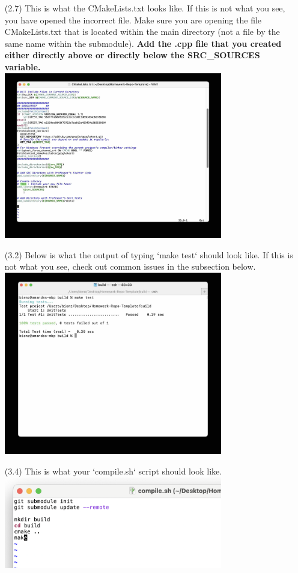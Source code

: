 \documentclass{article} %
\begin{document}
\begin{enumerate}
    \item [(2.7)] This is what the CMakeLists.txt looks like.  If this is not what you see, you have opened the incorrect file.  Make sure you are opening the file CMakeLists.txt that is located within the main directory (not a file by the same name within the submodule).  \textbf{Add the .cpp file that you created either directly above or directly below the SRC\_SOURCES variable.}\\
    \includegraphics[width=0.75\textwidth]{figs/8_cmake.jpg}

    \item [(3.2)] Below is what the output of typing `make test` should look like.  If this is not what you see, check out common issues in the subsection below.\\
    \includegraphics[width=0.75\textwidth]{figs/9_googletest.jpg}

    \item [(3.4)] This is what your `compile.sh` script should look like.\\
    \includegraphics[width=0.75\textwidth]{figs/10config.png}


\end{enumerate}
\end{document}
